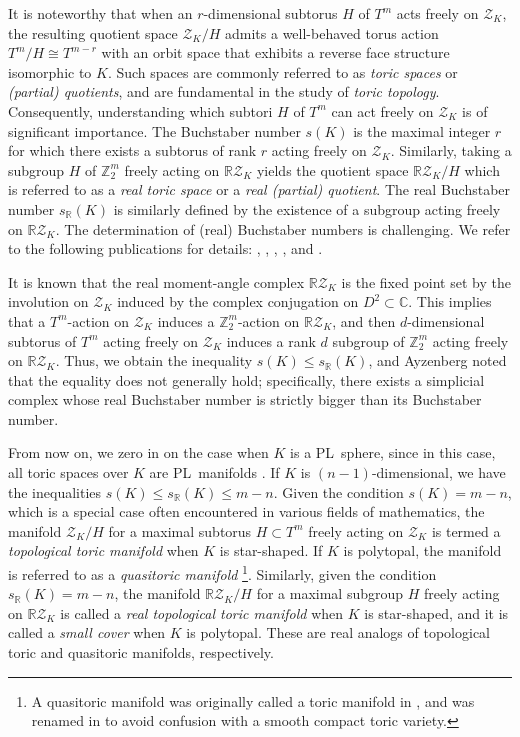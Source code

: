 \documentclass[11pt]{amsart}
\theoremstyle{plain}
\numberwithin{equation}{section}
\theoremstyle{definition}
\newcommand{\C}{\mathbb{C}}
\newcommand{\R}{\mathbb{R}}
\newcommand{\Z}{\mathbb{Z}}
\newcommand{\cZ}{\mathcal{Z}}
\begin{document}
It is noteworthy that when an $r$-dimensional subtorus $H$ of $T^m$ acts freely on $\cZ_K$, the resulting quotient space $\cZ_K /H$ admits a well-behaved torus action $T^m/H \cong T^{m-r}$ with an orbit space that exhibits a reverse face structure isomorphic to $K$.
Such spaces are commonly referred to as \emph{toric spaces} or \emph{(partial) quotients}, and are fundamental in the study of \emph{toric topology}.
Consequently, understanding which subtori $H$ of $T^m$ can act freely on $\cZ_K$ is of significant importance.
The Buchstaber number $s(K)$ is the maximal integer $r$ for which there exists a subtorus of rank $r$ acting freely on $\cZ_K$.
Similarly, taking a subgroup $H$ of $\Z_2^m$ freely acting on $\R\cZ_K$ yields the quotient space $\R\cZ_K / H$ which is referred to as a \emph{real toric space} or a \emph{real (partial) quotient}.
The real Buchstaber number $s_\R(K)$ is similarly defined by the existence of a subgroup acting freely on $\R\cZ_K$.
The determination of (real) Buchstaber numbers is challenging.
We refer to the following publications for details:
\cite{BP2002}, \cite{Fukukawa2011}, \cite{Erokhovets2014}, \cite{Ayzenberg2016}, and \cite{Shen2023}.

It is known that the real moment-angle complex $\R\cZ_K$ is the fixed point set by the involution on $\cZ_K$ induced by the complex conjugation on $D^2 \subset \C$.
This implies that a $T^m$-action on $\cZ_K$ induces a $\Z_2^m$-action on $\R\cZ_K$, and then $d$-dimensional subtorus of $T^m$ acting freely on $\cZ_K$ induces a rank $d$ subgroup of $\Z_2^m$ acting freely on $\R\cZ_K$.
Thus, we obtain the inequality $s(K) \leq s_\R(K)$, and Ayzenberg \cite{Ayzenberg2011} noted that the equality does not generally hold; specifically, there exists a simplicial complex whose real Buchstaber number is strictly bigger than its Buchstaber number.

From now on, we zero in on the case when $K$ is a PL~sphere, since in this case, all toric spaces over \( K \) are PL~manifolds  \cite{Cai2017}.
If $K$ is $(n-1)$-dimensional, we have the inequalities $s(K)\leq s_\R(K) \leq m-n$.
Given the condition $s(K) = m-n$, which is a special case often encountered in various fields of mathematics, the manifold $\cZ_K / H$ for a maximal subtorus $H \subset T^m$ freely acting on $\cZ_K$ is termed a \emph{topological toric manifold} \cite{Ishida-Fukukawa-Masuda2013} when $K$ is star-shaped.
If $K$ is polytopal, the manifold is referred to as a \emph{quasitoric manifold} \cite{Davis-Januszkiewicz1991}\footnote{A quasitoric manifold was originally called a toric manifold in \cite{Davis-Januszkiewicz1991}, and was renamed in \cite{BP2002} to avoid confusion with a smooth compact toric variety.}.
Similarly, given the condition $s_\R(K)=m-n$, the manifold $\R\cZ_K / H$ for a maximal subgroup $H$ freely acting on $\R\cZ_K$ is called a \emph{real topological toric manifold} when $K$ is star-shaped, and it is called a \emph{small cover} when $K$ is polytopal.
These are real analogs of topological toric and quasitoric manifolds, respectively.
\end{document}
